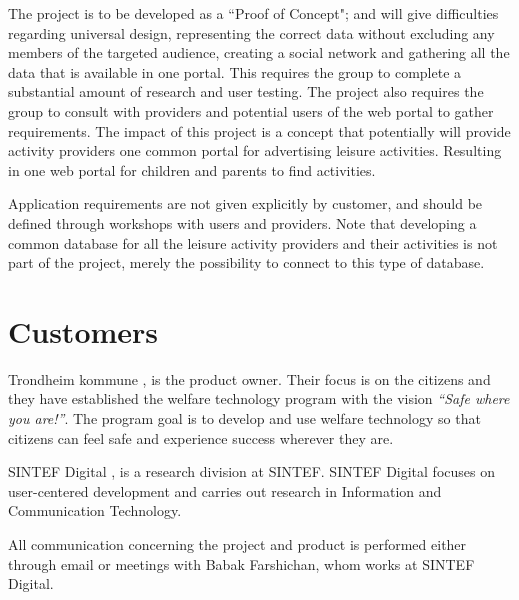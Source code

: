 The project is to be developed as a “Proof of Concept"; and will give difficulties regarding universal design, representing the correct data without excluding any members of the targeted audience, creating a social network and gathering all the data that is available in one portal. This requires the group to complete a substantial amount of research and user testing. The project also requires the group to consult with providers and potential users of the web portal to gather requirements. The impact of this project is a concept that potentially will provide activity providers one common portal for advertising leisure activities. Resulting in one web portal for children and parents to find activities.

Application requirements are not given explicitly by customer, and should be defined through workshops with users and providers. Note that developing a common database for all the leisure activity providers and their activities is not part of the project, merely the possibility to connect to this type of database. 

\section{Customers}
Trondheim kommune \cite{TrondheimMunicipality}, is the product owner. Their focus is on the citizens and they have established the welfare technology program \cite{WelfareProgram} with the vision \textit{“Safe where you are!”}. The program goal is to develop and use welfare technology so that citizens can feel safe and experience success wherever they are.

SINTEF Digital \cite{SintefDigital}, is a research division at SINTEF. SINTEF Digital focuses on user-centered development and carries out research in Information and Communication Technology.

All communication concerning the project and product is performed either through email or meetings with Babak Farshichan, whom works at SINTEF Digital.

\cleardoublepage